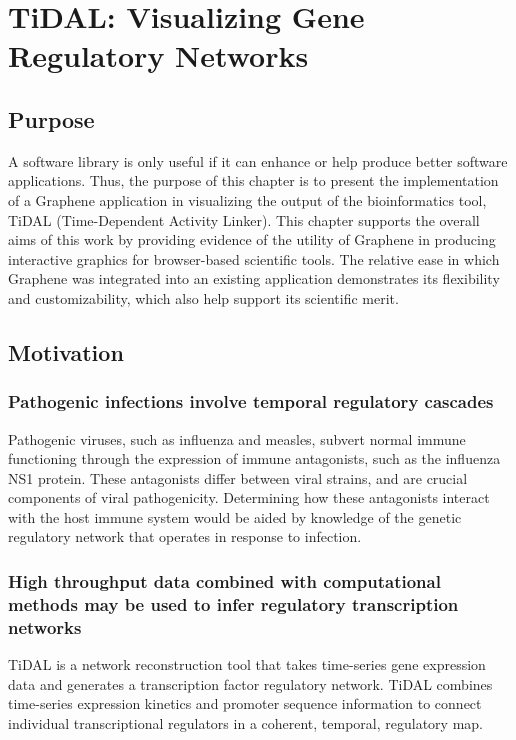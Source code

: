 \chapter{TiDAL: Visualizing Gene Regulatory Networks}
\label{chap:tidal}

\section{Purpose}

A software library is only useful if it can enhance or help produce better software applications.
Thus, the purpose of this chapter is to present the implementation of a Graphene application in visualizing the output of the bioinformatics tool, TiDAL (Time-Dependent Activity Linker).
This chapter supports the overall aims of this work by providing evidence of the utility of Graphene in producing interactive graphics for browser-based scientific tools.
The relative ease in which Graphene was integrated into an existing application demonstrates its flexibility and customizability, which also help support its scientific merit.

\section{Motivation}
\subsection{Pathogenic infections involve temporal regulatory cascades}

Pathogenic viruses, such as influenza and measles, subvert normal immune functioning through the expression of immune antagonists, such as the influenza NS1 protein. 
These antagonists differ between viral strains, and are crucial components of viral pathogenicity. 
Determining how these antagonists interact with the host immune system would be aided by knowledge of the genetic regulatory network that operates in response to infection. 


\subsection{High throughput data combined with computational methods may be used to infer regulatory transcription networks}



TiDAL \autocite{zaslavsky2013reconstruction} is a network reconstruction tool that takes time-series gene expression data and generates a transcription factor regulatory network.
TiDAL combines time-series expression kinetics and promoter sequence information to connect individual transcriptional regulators in a coherent, temporal, regulatory map. 

